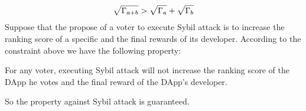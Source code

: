 \begin{align}
	\label{eq:sqrt_nr}
	\sqrt{\Gamma_{a+b}}>\sqrt{\Gamma_a}+\sqrt{\Gamma_b}
\end{align}
Suppose that the propose of a voter to execute Sybil attack is to increase the ranking score of a specific and the final rewards of its developer. According to the constraint above we have the following property:

\begin{property}
	\label{p3}
    For any voter, executing Sybil attack will not increase the ranking score of the DApp he votes and the final reward of the DApp's developer.
\end{property}
So the property against Sybil attack is guaranteed.
